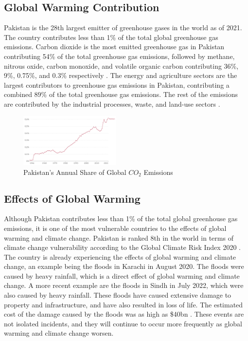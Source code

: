 \documentclass{article}
\begin{document}
\subsection{Global Warming Contribution}
Pakistan is the 28th largest emitter of greenhouse gases in the world as of
2021\cite{Ritchie_Roser_Rosado}. The country contributes less than 1\% of the
total global greenhouse gas emissions. Carbon dioxide is the most emitted
greenhouse gas in Pakistan contributing 54\% of the total greenhouse gas
emissions, followed by methane, nitrous oxide, carbon monoxide, and volatile
organic carbon contributing 36\%, 9\%, 0.75\%, and 0.3\% respectively
\cite{hussain2019comprehensive}. The energy and agriculture sectors are the
largest contributors to greenhouse gas emissions in Pakistan, contributing a
combined 89\% of the total greenhouse gas emissions. The rest of the emissions
are contributed by the industrial processes, waste, and land-use sectors
\cite{mir2017sectoral}.
\begin{figure}[H]
    \centering
    \includegraphics[width=0.45\textwidth]{annual_share.png}
    \caption{Pakistan's Annual Share of Global $CO_2$ Emissions}
    \label{fig:pak-emissions}
\end{figure}

\subsection{Effects of Global Warming}
Although Pakistan contributes less than 1\% of the total global greenhouse gas
emissions, it is one of the most vulnerable countries to the effects of global
warming and climate change. Pakistan is ranked 8th in the world in terms of
climate change vulnerability according to the Global Climate Risk Index 2020
\cite{Eckstein_Künzel_Schäfer_Winges}. The country is already experiencing the
effects of global warming and climate change, an example being the floods in
Karachi in August 2020. The floods were caused by heavy rainfall, which is a
direct effect of global warming and climate change. A more recent example are
the floods in Sindh in July 2022, which were also caused by heavy rainfall.
These floods have caused extensive damage to property and infrastructure, and
have also resulted in loss of life. The estimated cost of the damage caused by
the floods was as high as \$40bn \cite{Javaid_2022}. These events are not
isolated incidents, and they will continue to occur more frequently as global
warming and climate change worsen.
\end{document}
